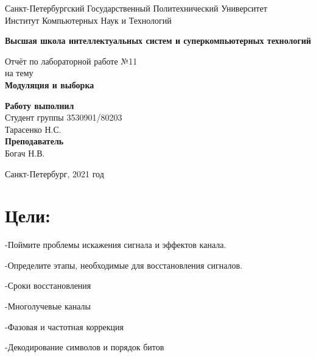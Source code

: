 \documentclass[10pt,a4paper,oneside]{article}
\begin{document}
\begin{titlepage}
\newpage
	\begin{center}
		\Large Санкт-Петербургский Государственный Политехнический Университет\\
		Институт Компьютерных Наук и Технологий\\
	\end{center}
	\begin{center}
		\large\textbf {Высшая школа интеллектуальных систем и суперкомпьютерных технологий}
	\end{center}
	
	\vspace{5em}
	\begin{center}
		\large{Отчёт по лабораторной работе №11 \\ на тему \\
		\textbf{Модуляция и выборка} }
	\end{center}
	
	\vspace{25em}
	\begin{flushright}
		\textbf{Работу выполнил\\}Студент группы 3530901/80203 \\ Тарасенко Н.С.\\
		\textbf{Преподаватель\\}Богач Н.В. 
	\end{flushright}
	
	\vspace{\fill}%
	\begin{center}
	Санкт-Петербург, 2021 год	
	\end{center}
\end{titlepage} %

\section{Цели:}
    -Поймите проблемы искажения сигнала и эффектов канала.

-Определите этапы, необходимые для восстановления сигналов.

    -Сроки восстановления
    
    -Многолучевые каналы
    
    -Фазовая и частотная коррекция
    
    -Декодирование символов и порядок битов
    
\end{document}

